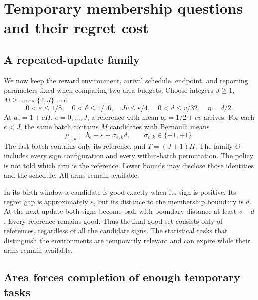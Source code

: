\section{Temporary membership questions and their regret cost}
\label{sec:tradeoff}

\subsection{A repeated-update family}

We now keep the reward environment, arrival schedule, endpoint, and reporting
parameters fixed when comparing two area budgets. Choose integers $J\ge1$,
$M\ge\max\{2,J\}$ and
\begin{equation}
 0<\varepsilon\le1/8,\quad 0<\delta\le1/16,\quad
 Jv\le\varepsilon/4,\quad 0<d\le v/32,\quad\eta=d/2.
 \label{eq:family_parameters}
\end{equation}
At $a_e=1+eH$, $e=0,\ldots,J$, a reference with mean $b_e=1/2+ev$
arrives. For each $e<J$, the same batch contains $M$ candidates with Bernoulli
means
\begin{equation}
 \mu_{e,k}=b_e-\varepsilon+\sigma_{e,k}d,
           \qquad \sigma_{e,k}\in\{-1,+1\}.
 \label{eq:family_means}
\end{equation}
The last batch contains only its reference, and $T=(J+1)H$. The family
$\Theta$ includes every sign configuration and every within-batch permutation.
The policy is not told which arm is the reference. Lower bounds may disclose
those identities and the schedule. All arms remain available.

In its birth window a candidate is good exactly when its sign is positive.
Its regret gap is approximately $\varepsilon$, but its distance to the
membership boundary is $d$. At the next update both signs become bad, with
boundary distance at least $v-d$. Every reference remains good. Thus the final
good set consists only of references, regardless of all the candidate signs.
The statistical tasks that distinguish the environments are temporarily
relevant and can expire while their arms remain available.

\subsection{Area forces completion of enough temporary tasks}

